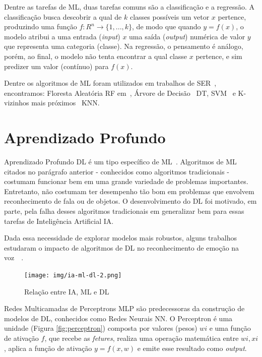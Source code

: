 Dentre as tarefas de \acrshort{ML}, duas tarefas comuns são a classificação e a regressão. A classificação busca descobrir a qual de $k$ classes possíveis um vetor $x$ pertence, produzindo uma função $f: R^n \rightarrow \{1, ..., k\}$, de modo que quando $y = f(x)$, o modelo atribui a uma entrada (\textit{input}) $x$ uma saída (\textit{output}) numérica de valor $y$ que representa uma categoria (classe). Na regressão, o pensamento é análogo, porém, ao final, o modelo não tenta encontrar a qual classe $x$ pertence, e sim predizer um valor (contínuo) para $f(x)$.

Dentre os algoritmos de \acrshort{ML} foram utilizados em trabalhos de SER~\cite{20.7}, encontramos: Floresta Aleatória \acrfull{RF} em~\cite{20.10}, Árvore de Decisão~\cite{20.11} \acrlong{DT}, \acrshort{SVM}~\cite{20.13} e K-vizinhos mais próximos~\cite{20.15} \acrlong{KNN}.%

\section{Aprendizado Profundo}\label{sec:dl}

Aprendizado Profundo \acrshort{DL} é um tipo específico de \acrshort{ML}~\cite{53}. Algoritmos de \acrshort{ML} citados no parágrafo anterior - conhecidos como algoritmos tradicionais - costumam funcionar bem em uma grande variedade de problemas importantes. Entretanto, não costumam ter desempenho tão bom em problemas que envolvem reconhecimento de fala ou de objetos. O desenvolvimento do \acrshort{DL} foi motivado, em parte, pela falha desses algoritmos tradicionais em generalizar bem para essas tarefas de Inteligência Artificial \acrlong{IA}.

Dada essa necessidade de explorar modelos mais robustos, alguns trabalhos estudaram o impacto de algoritmos de \acrshort{DL} no reconhecimento de emoção na voz~\cite{12.12}~\cite{12.16}.

\begin{figure}[!h]
\centering
\texttt{[image: img/ia-ml-dl-2.png]}
\caption{\label{fig:ia-ml-dl}Relação entre \acrshort{IA}, \acrshort{ML} e \acrshort{DL}~\cite{img_iavsmlvsdl}}

\author{Fonte: Retirada de~\cite{58}}
\end{figure}

Redes Multicamadas de Perceptrons \acrlong{MLP} são predecessoras da construção de modelos de \acrshort{DL}, conhecidos como Redes Neurais \acrlong{NN}. O Perceptron é uma unidade (Figura \ref{fig:perceptron}) composta por valores (pesos) $wi$ e uma função de ativação $f$,  que recebe as \textit{fetures}, realiza uma operação matemática entre $wi,xi$, aplica a função de ativação $y = f(x,w)$ e emite esse resultado como \textit{output}.

